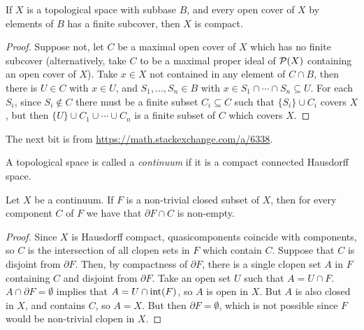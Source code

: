 \begin{thm}\label{alexander-subbase} If $X$ is a topological space with subbase $B$, and every open cover of $X$ by elements of $B$ has a finite subcover, then $X$ is compact.
\end{thm}
\begin{proof} Suppose not, let $C$ be a maximal open cover of $X$ which has no finite subcover (alternatively, take $C$ to be a maximal proper ideal of $\mathcal{P}(X)$ containing an open cover of $X$). Take $x \in X$ not contained in any element of $C\cap B$, then there is $U \in C$ with $x \in U$, and $S_1, ..., S_n \in B$ with $x \in S_1 \cap \cdots \cap S_n \subseteq U$. For each $S_i$, since $S_i \not\in C$ there must be a finite subset $C_i \subseteq C$ such that $\{S_i\} \cup C_i$ covers $X$, but then $\{U\} \cup C_1 \cup \cdots \cup C_n$ is a finite subset of $C$ which covers $X$.
\end{proof}

The next bit is from \url{https://math.stackexchange.com/a/6338}.

\begin{defn} A topological space is called a \emph{continuum} if it is a compact connected Hausdorff space.
\end{defn}

\begin{lem} Let $X$ be a continuum. If $F$ is a non-trivial closed subset of $X$, then for every component $C$ of $F$ we have that $\partial F \cap C$ is non-empty.
\end{lem}
\begin{proof} Since $X$ is Hausdorff compact, quasicomponents coincide with components, so $C$ is the intersection of all clopen sets in $F$ which contain $C$. Suppose that $C$ is disjoint from $\partial F$. Then, by compactness of $\partial F$, there is a single clopen set $A$ in $F$ containing $C$ and disjoint from $\partial F$. Take an open set $U$ such that $A = U \cap F$. $A \cap \partial F = \emptyset$ implies that $A = U \cap \operatorname{int}(F)$, so $A$ is open in $X$. But $A$ is also closed in $X$, and contains $C$, so $A=X$. But then $\partial F = \emptyset$, which is not possible since $F$ would be non-trivial clopen in $X$.
\end{proof}

